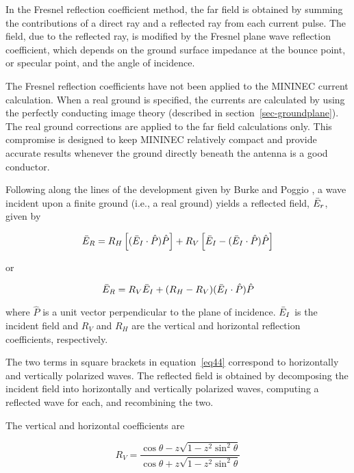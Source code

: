 \documentclass[12pt]{article}
\begin{document}
In the Fresnel reflection coefficient method, the far field is obtained
by summing the contributions of a direct ray and a reflected ray from
each current pulse. The field, due to the reflected ray, is modified by
the Fresnel plane wave reflection coefficient, which depends on the
ground surface impedance at the bounce point, or specular point, and the
angle of incidence.

The Fresnel reflection coefficients have not been applied to the MININEC
current calculation. When a real ground is specified, the currents are
calculated by using the perfectly conducting image theory (described in
section~\ref{sec-groundplane}). The real ground corrections are applied
to the far field calculations only. This compromise is designed to keep
MININEC relatively compact and provide accurate results whenever the
ground directly beneath the antenna is a good conductor.

Following along the lines of the development given by Burke and Poggio
\cite{r4}, a wave incident upon a finite ground (i.e., a
real ground) yields a reflected field, $\bar{E}_r$, given by

\begin{equation}
\bar{E}_R = R_H\left[(\bar{E}_I\cdot\hat{P})\hat{P}\right]
           + R_V\left[\bar{E}_I-(\bar{E}_I\cdot\hat{P})\hat{P}\right]
\label{eq45}
\end{equation}

\noindent or

\begin{equation}
\bar{E}_R = R_V\bar{E}_I + (R_H - R_V)(\bar{E}_I\cdot\hat{P})\hat{P}
\label{eq46}
\end{equation}

\noindent where $\hat{P}$ is a unit vector perpendicular to the plane of
incidence. $\bar{E}_I$ is the incident field and $R_V$ and $R_H$ are
the vertical and horizontal reflection coefficients, respectively.

The two terms in square brackets in equation~\eqref{eq44} correspond to
horizontally and vertically polarized waves. The reflected field is
obtained by decomposing the incident field into horizontally and
vertically polarized waves, computing a reflected wave for each, and
recombining the two.

The vertical and horizontal coefficients are

\begin{equation}
R_V = \frac{\cos\theta - z\sqrt{1-z^2\sin^2\theta}}
           {\cos\theta + z\sqrt{1-z^2\sin^2\theta}}
\label{eq47}
\end{equation}
\end{document}
